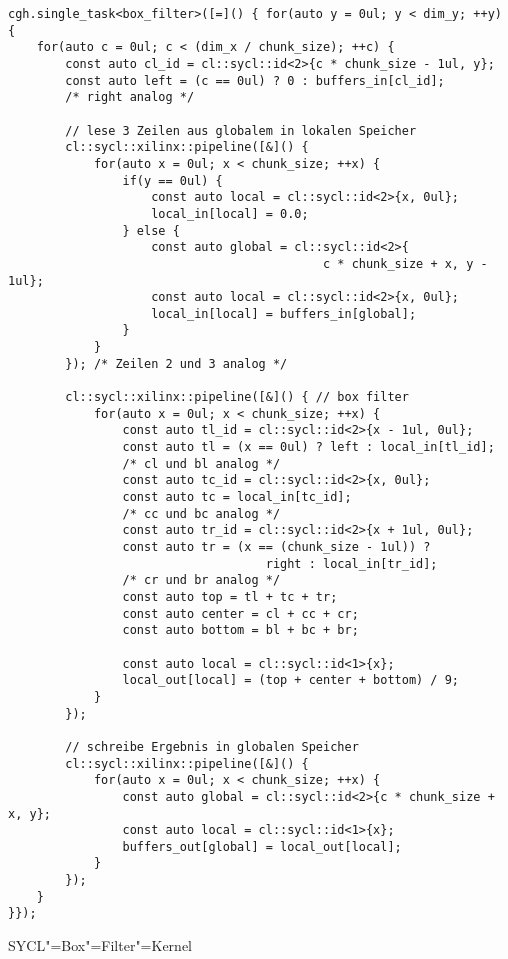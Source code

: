 \begin{code}
    \begin{verbatim}
cgh.single_task<box_filter>([=]() { for(auto y = 0ul; y < dim_y; ++y) {
    for(auto c = 0ul; c < (dim_x / chunk_size); ++c) {
        const auto cl_id = cl::sycl::id<2>{c * chunk_size - 1ul, y};
        const auto left = (c == 0ul) ? 0 : buffers_in[cl_id];
        /* right analog */

        // lese 3 Zeilen aus globalem in lokalen Speicher
        cl::sycl::xilinx::pipeline([&]() {
            for(auto x = 0ul; x < chunk_size; ++x) {
                if(y == 0ul) {
                    const auto local = cl::sycl::id<2>{x, 0ul};
                    local_in[local] = 0.0;
                } else {
                    const auto global = cl::sycl::id<2>{
                                            c * chunk_size + x, y - 1ul}; 
                    const auto local = cl::sycl::id<2>{x, 0ul};
                    local_in[local] = buffers_in[global];
                }
            }
        }); /* Zeilen 2 und 3 analog */

        cl::sycl::xilinx::pipeline([&]() { // box filter
            for(auto x = 0ul; x < chunk_size; ++x) {
                const auto tl_id = cl::sycl::id<2>{x - 1ul, 0ul};
                const auto tl = (x == 0ul) ? left : local_in[tl_id];
                /* cl und bl analog */
                const auto tc_id = cl::sycl::id<2>{x, 0ul};
                const auto tc = local_in[tc_id];
                /* cc und bc analog */
                const auto tr_id = cl::sycl::id<2>{x + 1ul, 0ul};
                const auto tr = (x == (chunk_size - 1ul)) ?
                                    right : local_in[tr_id];
                /* cr und br analog */
                const auto top = tl + tc + tr;
                const auto center = cl + cc + cr;
                const auto bottom = bl + bc + br;

                const auto local = cl::sycl::id<1>{x};
                local_out[local] = (top + center + bottom) / 9;
            }
        });

        // schreibe Ergebnis in globalen Speicher
        cl::sycl::xilinx::pipeline([&]() {
            for(auto x = 0ul; x < chunk_size; ++x) {
                const auto global = cl::sycl::id<2>{c * chunk_size + x, y};
                const auto local = cl::sycl::id<1>{x};
                buffers_out[global] = local_out[local];
            }
        });
    }
}});
    \end{verbatim}
    \caption{SYCL"=Box"=Filter"=Kernel}
\end{code}

